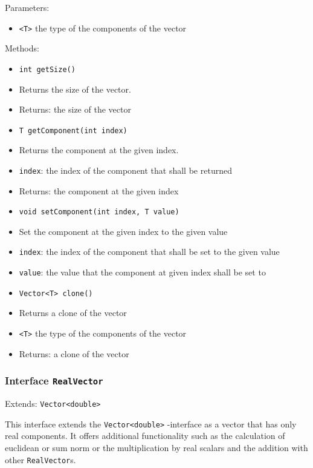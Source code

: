 \documentclass[parskip=full,11pt]{scrartcl}
\begin{document}
Parameters:
\begin{itemize}\itemsep -10pt
\item \texttt{<T>} the type of the components of the vector
\end{itemize}

Methods:
\begin{itemize}\itemsep -10pt
\item \texttt{int getSize()}
\item[] Returns the size of the vector.
\item[] Returns: the size of the vector

\item \texttt{T getComponent(int index)}
\item[] Returns the component at the given index.
\item[] \texttt{index}: the index of the component that shall be returned
\item[] Returns: the component at the given index

\item \texttt{void setComponent(int index, T value)}
\item[] Set the component at the given index to the given value
\item[] \texttt{index}: the index of the component that shall be set to the given value
\item[] \texttt{value}: the value that the component at given index shall be set to

\item \texttt{Vector<T> clone()}
\item[] Returns a clone of the vector
\item[] \texttt{<T>} the type of the components of the vector
\item[] Returns: a clone of the vector
\end{itemize}

\subsubsection{Interface \texttt{RealVector}}
Extends: \texttt{Vector<double>}

This interface extends the \texttt{Vector<double>}
-interface as a vector that has only real components. It offers additional functionality such as the calculation of euclidean or sum norm or the multiplication by real scalars and the addition with other \texttt{RealVector}s.
\end{document}
